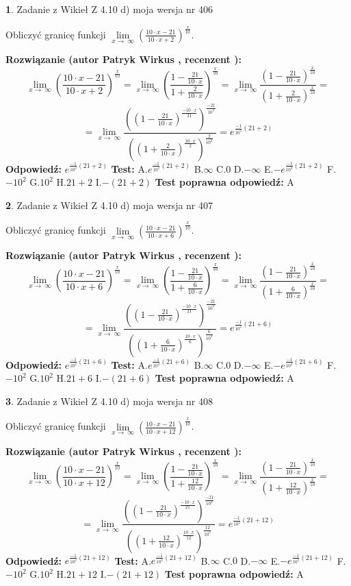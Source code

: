 \documentclass[12pt, a4paper]{article}
\theoremstyle{definition} %
\newtheorem{zad}{}
\newcommand{\zadStart}[1]{\begin{zad}#1\newline}
\newcommand{\zadStop}{\end{zad}}
\newcommand{\rozwStart}[2]{\noindent \textbf{Rozwiązanie (autor #1 , recenzent #2): }\newline}
\newcommand{\rozwStop}{\newline}
\newcommand{\odpStart}{\noindent \textbf{Odpowiedź:}\newline}
\newcommand{\odpStop}{\newline}
\newcommand{\testStart}{\noindent \textbf{Test:}\newline}
\newcommand{\testStop}{\newline}
\newcommand{\kluczStart}{\noindent \textbf{Test poprawna odpowiedź:}\newline}
\newcommand{\kluczStop}{\newline}
\begin{document}
\zadStart{Zadanie z Wikieł Z 4.10 d) moja wersja nr 406}


Obliczyć granicę funkcji  $\lim\limits_{x\to\ \infty}(\frac{10\cdot x-21}{10\cdot x+2})^{\frac{x}{10}}$.
\zadStop
\rozwStart{Patryk Wirkus}{}
$$\lim\limits_{x\to\ \infty}(\frac{10\cdot x-21}{10\cdot x+2})^{\frac{x}{10}} = \lim\limits_{x\to\ \infty}(\frac{1-\frac{21}{10\cdot x}}{1+\frac{2}{10\cdot x}})^{\frac{x}{10}}=\lim\limits_{x\to\ \infty}\frac{(1-\frac{21}{10\cdot x})^{\frac{x}{10}}}{(1+\frac{2}{10\cdot x})^{\frac{x}{10}}}=$$
$$=\lim\limits_{x\to\ \infty}\frac{((1-\frac{21}{10\cdot x})^{\frac{-10\cdot x}{21}})^{\frac{-21}{10^{2}}}}{((1+\frac{2}{10\cdot x})^{\frac{10\cdot x}{2}})^{\frac{2}{10^{2}}}}=e^{\frac{-1}{10^{2}}(21+2)}$$
\rozwStop
\odpStart
$e^{\frac{-1}{10^{2}}(21+2)}$
\odpStop
\testStart
A.$e^{\frac{-1}{10^{2}}(21+2)}$ B.$\infty$ C.$0$ D.$-\infty$ E.$-e^{\frac{-1}{10^{2}}(21+2)}$
F.$-10^{2}$ G.$10^{2}$
H.$21+2$
I.$-(21+2)$
\testStop
\kluczStart
A
\kluczStop



\zadStart{Zadanie z Wikieł Z 4.10 d) moja wersja nr 407}


Obliczyć granicę funkcji  $\lim\limits_{x\to\ \infty}(\frac{10\cdot x-21}{10\cdot x+6})^{\frac{x}{10}}$.
\zadStop
\rozwStart{Patryk Wirkus}{}
$$\lim\limits_{x\to\ \infty}(\frac{10\cdot x-21}{10\cdot x+6})^{\frac{x}{10}} = \lim\limits_{x\to\ \infty}(\frac{1-\frac{21}{10\cdot x}}{1+\frac{6}{10\cdot x}})^{\frac{x}{10}}=\lim\limits_{x\to\ \infty}\frac{(1-\frac{21}{10\cdot x})^{\frac{x}{10}}}{(1+\frac{6}{10\cdot x})^{\frac{x}{10}}}=$$
$$=\lim\limits_{x\to\ \infty}\frac{((1-\frac{21}{10\cdot x})^{\frac{-10\cdot x}{21}})^{\frac{-21}{10^{2}}}}{((1+\frac{6}{10\cdot x})^{\frac{10\cdot x}{6}})^{\frac{6}{10^{2}}}}=e^{\frac{-1}{10^{2}}(21+6)}$$
\rozwStop
\odpStart
$e^{\frac{-1}{10^{2}}(21+6)}$
\odpStop
\testStart
A.$e^{\frac{-1}{10^{2}}(21+6)}$ B.$\infty$ C.$0$ D.$-\infty$ E.$-e^{\frac{-1}{10^{2}}(21+6)}$
F.$-10^{2}$ G.$10^{2}$
H.$21+6$
I.$-(21+6)$
\testStop
\kluczStart
A
\kluczStop



\zadStart{Zadanie z Wikieł Z 4.10 d) moja wersja nr 408}


Obliczyć granicę funkcji  $\lim\limits_{x\to\ \infty}(\frac{10\cdot x-21}{10\cdot x+12})^{\frac{x}{10}}$.
\zadStop
\rozwStart{Patryk Wirkus}{}
$$\lim\limits_{x\to\ \infty}(\frac{10\cdot x-21}{10\cdot x+12})^{\frac{x}{10}} = \lim\limits_{x\to\ \infty}(\frac{1-\frac{21}{10\cdot x}}{1+\frac{12}{10\cdot x}})^{\frac{x}{10}}=\lim\limits_{x\to\ \infty}\frac{(1-\frac{21}{10\cdot x})^{\frac{x}{10}}}{(1+\frac{12}{10\cdot x})^{\frac{x}{10}}}=$$
$$=\lim\limits_{x\to\ \infty}\frac{((1-\frac{21}{10\cdot x})^{\frac{-10\cdot x}{21}})^{\frac{-21}{10^{2}}}}{((1+\frac{12}{10\cdot x})^{\frac{10\cdot x}{12}})^{\frac{12}{10^{2}}}}=e^{\frac{-1}{10^{2}}(21+12)}$$
\rozwStop
\odpStart
$e^{\frac{-1}{10^{2}}(21+12)}$
\odpStop
\testStart
A.$e^{\frac{-1}{10^{2}}(21+12)}$ B.$\infty$ C.$0$ D.$-\infty$ E.$-e^{\frac{-1}{10^{2}}(21+12)}$
F.$-10^{2}$ G.$10^{2}$
H.$21+12$
I.$-(21+12)$
\testStop
\kluczStart
A
\kluczStop
\end{document}
